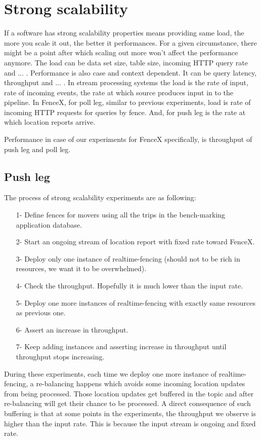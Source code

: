\documentclass[a4]{report}
\begin{document}
    \section{Strong scalability}
    If a software has strong scalability properties means providing same load, the more you scale it out, the better
    it performances.
    For a given circumstance, there might be a point after which scaling out more won't affect the performance anymore.
    The load can be data set size, table size, incoming HTTP query rate and ... .
    Performance is also case and context dependent.
    It can be query latency, throughput and ... .
    In stream processing systems the load is the rate of input, rate of incoming events, the rate at
    which source produces input in to the pipeline.
    In FenceX, for poll leg, similar to previous experiments, load is rate of incoming HTTP requests for queries by
    fence.
    And, for push leg is the rate at which location reports arrive.

    Performance in case of our experiments for FenceX specifically, is throughput of push leg and poll leg.

    \subsection{Push leg}
    The process of strong scalability experiments are as following:
    \begin{itemize}
        \item[1-] Define fences for movers using all the trips in the bench-marking application database.
        \item[2-] Start an ongoing stream of location report with fixed rate toward FenceX.
        \item[3-] Deploy only one instance of realtime-fencing (should not to be rich in resources, we want it to
        be overwhelmed).
        \item[4-] Check the throughput. Hopefully it is much lower than the input rate.
        \item[5-] Deploy one more instances of realtime-fencing with exactly same resources as previous one.
        \item[6-] Assert an increase in throughput.
        \item[7-] Keep adding instances and asserting increase in throughput until throughput stops increasing.
    \end{itemize}

    During these experiments, each time we deploy one more instance of realtime-fencing, a re-balancing happens which
    avoids some incoming location updates from being processed.
    Those location updates get buffered in the topic and after re-balancing will get their chance to be processed.
    A direct consequence of such buffering is that at some points in the experiments, the throughput we observe is
    higher than the input rate.
    This is because the input stream is ongoing and fixed rate.
\end{document}
